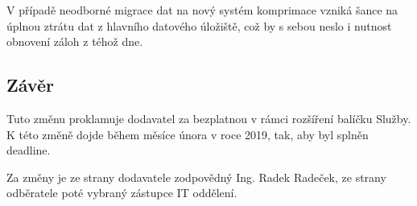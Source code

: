 \documentclass[11pt, a4paper, titlepage]{article}
\begin{document}
	V případě neodborné migrace dat na nový systém komprimace vzniká šance na úplnou ztrátu dat z hlavního datového úložiště, což by s sebou neslo i nutnost obnovení záloh z téhož dne.

	\subsection{Závěr}

	Tuto změnu proklamuje dodavatel za bezplatnou v rámci rozšíření balíčku Služby. K této změně dojde během měsíce února v roce 2019, tak, aby byl splněn deadline.

	Za změny je ze strany dodavatele zodpovědný Ing. Radek Radeček, ze strany odběratele poté vybraný zástupce IT oddělení.
\end{document}
